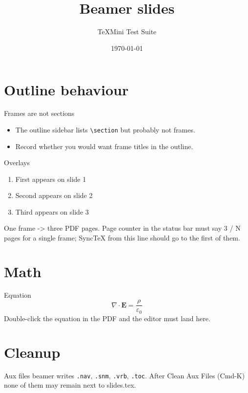 \documentclass{beamer}
\title{Beamer slides}
\author{TeXMini Test Suite}
\date{\today}
\begin{document}
\begin{frame}
  \titlepage
\end{frame}

\section{Outline behaviour}
\begin{frame}[fragile]{Frames are not sections}
  \begin{itemize}
    \item The outline sidebar lists \verb|\section| but probably not frames.
    \item Record whether you would want frame titles in the outline.
  \end{itemize}
\end{frame}

\begin{frame}{Overlays}
  \begin{enumerate}
    \item<1-> First appears on slide 1
    \item<2-> Second appears on slide 2
    \item<3-> Third appears on slide 3
  \end{enumerate}
  One frame -> three PDF pages. Page counter in the status bar must say 3 / N
  pages for a single frame; SyncTeX from this line should go to the first of them.
\end{frame}

\section{Math}
\begin{frame}{Equation}
  \begin{equation}
    \nabla \cdot \mathbf{E} = \frac{\rho}{\varepsilon_0}
  \end{equation}
  Double-click the equation in the PDF and the editor must land here.
\end{frame}

\section{Cleanup}
\begin{frame}{Aux files}
  beamer writes \texttt{.nav}, \texttt{.snm}, \texttt{.vrb}, \texttt{.toc}.
  After Clean Aux Files (Cmd-K) none of them may remain next to slides.tex.
\end{frame}
\end{document}
